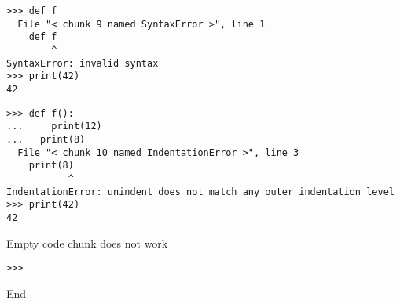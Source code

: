 \begin{verbatim}
>>> def f
  File "< chunk 9 named SyntaxError >", line 1
    def f
        ^
SyntaxError: invalid syntax
>>> print(42)
42

\end{verbatim}


\begin{verbatim}
>>> def f():
...     print(12)
...   print(8)
  File "< chunk 10 named IndentationError >", line 3
    print(8)
           ^
IndentationError: unindent does not match any outer indentation level
>>> print(42)
42

\end{verbatim}

Empty code chunk does not work

\begin{verbatim}
>>>

\end{verbatim}

End

